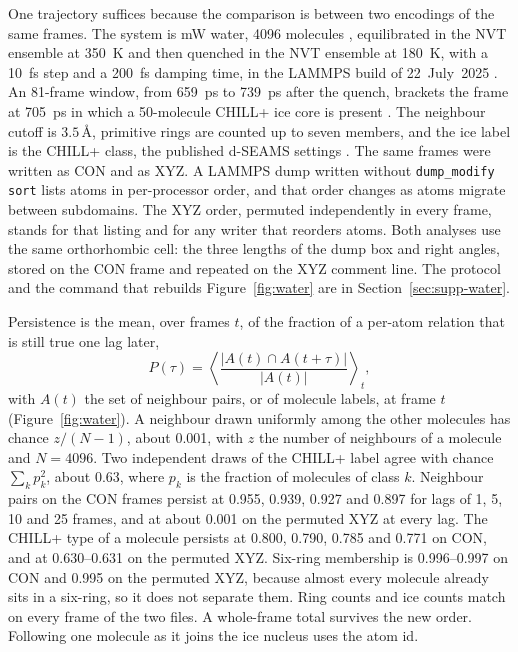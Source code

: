 One trajectory suffices because the comparison is between two encodings of the same frames.
The system is mW water, 4096 molecules
\cite{molineroWaterModeledIntermediate2009}, equilibrated in the NVT ensemble at 350~K and then quenched in the NVT ensemble at 180~K, with a 10~fs step and a 200~fs damping time, in the LAMMPS build of 22~July~2025
\cite{thompsonLammpsFlexibleSimulation2022}.
An 81-frame window, from 659~ps to 739~ps after the quench, brackets the frame at 705~ps in which a 50-molecule CHILL+ ice core is present
\cite{nguyenIdentificationClathrateHydrates2015}.
The neighbour cutoff is \(3.5\,\text{\AA}\), primitive rings are counted up to seven members, and the ice label is the CHILL+ class, the published d-SEAMS settings
\cite{goswamiDseamsDeferredStructural2020}.
The same frames were written as CON and as XYZ.
A LAMMPS dump written without \texttt{dump\_modify sort} lists atoms in per-processor order, and that order changes as atoms migrate between subdomains.
The XYZ order, permuted independently in every frame, stands for that listing and for any writer that reorders atoms.
Both analyses use the same orthorhombic cell: the three lengths of the dump box and right angles, stored on the CON frame and repeated on the XYZ comment line.
The protocol and the command that rebuilds Figure~\ref{fig:water} are in Section~\ref{sec:supp-water}.

Persistence is the mean, over frames \(t\), of the fraction of a per-atom relation that is still true one lag later,
\begin{equation}
\label{eq:persist}
P(\tau)=\left\langle\frac{|A(t)\cap A(t+\tau)|}{|A(t)|}\right\rangle_{t},
\end{equation}
with \(A(t)\) the set of neighbour pairs, or of molecule labels, at frame \(t\) (Figure~\ref{fig:water}).
A neighbour drawn uniformly among the other molecules has chance \(z/(N-1)\), about 0.001, with \(z\) the number of neighbours of a molecule and \(N=4096\).
Two independent draws of the CHILL+ label agree with chance \(\sum_k p_k^{2}\), about 0.63, where \(p_k\) is the fraction of molecules of class \(k\).
Neighbour pairs on the CON frames persist at 0.955, 0.939, 0.927 and 0.897 for lags of 1, 5, 10 and 25 frames, and at about 0.001 on the permuted XYZ at every lag.
The CHILL+ type of a molecule persists at 0.800, 0.790, 0.785 and 0.771 on CON, and at 0.630--0.631 on the permuted XYZ.
Six-ring membership is 0.996--0.997 on CON and 0.995 on the permuted XYZ, because almost every molecule already sits in a six-ring, so it does not separate them.
Ring counts and ice counts match on every frame of the two files.
A whole-frame total survives the new order.
Following one molecule as it joins the ice nucleus uses the atom id.

